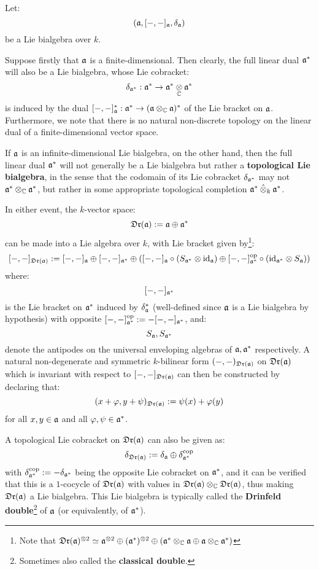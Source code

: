         \begin{remark} \label{remark: drinfeld_doubles}
            Let:
                $$(\mathfrak{a}, [-, -]_{\mathfrak{a}}, \delta_{\mathfrak{a}})$$
            be a Lie bialgebra over $k$.
        
            Suppose firstly that $\mathfrak{a}$ is a finite-dimensional. Then clearly, the full linear dual $\mathfrak{a}^*$ will also be a Lie bialgebra, whose Lie cobracket:
                $$\delta_{\a^*}: \a^* \to \a^* \tensor_{\bbC} \a^*$$
            is induced by the dual $[-, -]_{\a}^*: \a^* \to (\a \tensor_{\bbC} \a)^*$ of the Lie bracket on $\mathfrak{a}$. Furthermore, we note that there is no natural non-discrete topology on the linear dual of a finite-dimensional vector space.

            If $\mathfrak{a}$ is an infinite-dimensional Lie bialgebra, on the other hand, then the full linear dual $\mathfrak{a}^*$ will not generally be a Lie bialgebra but rather a \textbf{topological Lie bialgebra}, in the sense that the codomain of its Lie cobracket $\delta_{\mathfrak{a}^*}$ may not $\a^* \tensor_{\bbC} \a^*$, but rather in some appropriate topological completion $\a^* \hattensor_k \a^*$.

            In either event, the $k$-vector space:
                $$\mathfrak{Dr}(\mathfrak{a}) := \mathfrak{a} \oplus \mathfrak{a}^*$$
            can be made into a Lie algebra over $k$, with Lie bracket given by\footnote{Note that $\frakDr(\a)^{\tensor 2} \cong \a^{\tensor 2} \oplus (\a^*)^{\tensor 2} \oplus (\a^* \tensor_{\bbC} \a \oplus \a \tensor_{\bbC} \a^*)$}:
                $$[-, -]_{\frakDr(\a)} := [-, -]_{\a} \oplus [-, -]_{\a^*} \oplus ( [-, -]_{\a} \circ (S_{\a^*} \tensor \id_{\a}) \oplus [-, -]_{\a^*}^{\op} \circ (\id_{\a^*} \tensor S_{\a}) )$$
            where:
                $$[-, -]_{\mathfrak{a}^*}$$
            is the Lie bracket on $\mathfrak{a}^*$ induced by $\delta_{\mathfrak{a}}^*$ (well-defined since $\mathfrak{a}$ is a Lie bialgebra by hypothesis) with opposite $[-, -]_{\mathfrak{a}^*}^{\mathrm{op}} := -[-, -]_{\mathfrak{a}^*}$, and:
                $$S_{\mathfrak{a}}, S_{\mathfrak{a}^*}$$
            denote the antipodes on the universal enveloping algebras of $\mathfrak{a}, \mathfrak{a}^*$ respectively. A natural non-degenerate and symmetric $k$-bilinear form $(-, -)_{\mathfrak{Dr}(\mathfrak{a})}$ on $\mathfrak{Dr}(\mathfrak{a})$ which is invariant with respect to $[-, -]_{\mathfrak{Dr}(\mathfrak{a})}$ can then be constructed by declaring that:
                $$(x + \varphi, y + \psi)_{\mathfrak{Dr}(\mathfrak{a})} := \psi(x) + \varphi(y)$$
            for all $x, y \in \mathfrak{a}$ and all $\varphi, \psi \in \mathfrak{a}^*$. 

            A topological Lie cobracket on $\mathfrak{Dr}(\mathfrak{a})$ can also be given as:
                $$\delta_{\mathfrak{Dr}(\mathfrak{a})} := \delta_{\mathfrak{a}} \oplus \delta_{\mathfrak{a}^*}^{\mathrm{cop}}$$
            with $\delta_{\mathfrak{a}^*}^{\mathrm{cop}} := -\delta_{\mathfrak{a}^*}$ being the opposite Lie cobracket on $\mathfrak{a}^*$, and it can be verified that this is a $1$-cocycle of $\mathfrak{Dr}(\mathfrak{a})$ with values in $\frakDr(\a) \tensor_{\bbC} \frakDr(\a)$, thus making $\mathfrak{Dr}(\mathfrak{a})$ a Lie bialgebra. This Lie bialgebra is typically called the \textbf{Drinfeld double}\footnote{Sometimes also called the \textbf{classical double}.} of $\mathfrak{a}$ (or equivalently, of $\mathfrak{a}^*$).
        \end{remark}
        

